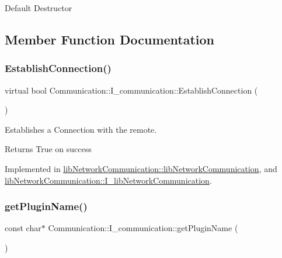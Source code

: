 Default Destructor 

\subsection{Member Function Documentation}
\mbox{\label{classCommunication_1_1I__communication_a2e602d8d262f409c36d4170898c61023}} 
\subsubsection{\texorpdfstring{EstablishConnection()}{EstablishConnection()}}
{\footnotesize\ttfamily virtual bool Communication\+::\+I\+\_\+communication\+::\+Establish\+Connection (\begin{DoxyParamCaption}{ }\end{DoxyParamCaption})\hspace{0.3cm}{\ttfamily [pure virtual]}}



Establishes a Connection with the remote. 

\begin{DoxyReturn}{Returns}
True on success 
\end{DoxyReturn}


Implemented in \mbox{\hyperlink{classlibNetworkCommunication_1_1libNetworkCommunication_a93730e78b0aeef62fc45974a26ecc3c0}{lib\+Network\+Communication\+::lib\+Network\+Communication}}, and \mbox{\hyperlink{classlibNetworkCommunication_1_1I__libNetworkCommunication_a03c615443e3a028782677c78d559b1c1}{lib\+Network\+Communication\+::\+I\+\_\+lib\+Network\+Communication}}.

\mbox{\label{classCommunication_1_1I__communication_a5ef61375a8126f29c38cc1aa17339563}} 
\subsubsection{\texorpdfstring{getPluginName()}{getPluginName()}}
{\footnotesize\ttfamily const char$\ast$ Communication\+::\+I\+\_\+communication\+::get\+Plugin\+Name (\begin{DoxyParamCaption}{ }\end{DoxyParamCaption})\hspace{0.3cm}{\ttfamily [pure virtual]}}



